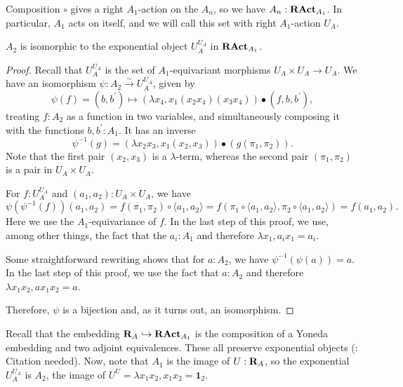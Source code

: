 \begin{definition}
  Composition $ \circ $ gives a right $ A_1 $-action on the $ A_n $, so we have $ A_n : \mathbf{RAct}_{A_1} $. In particular, $ A_1 $ acts on itself, and we will call this set with right $ A_1 $-action $ U_A $.
\end{definition}

\begin{lemma}
  $ A_2 $ is isomorphic to the exponential object $ U_A^{U_A} $ in $ \mathbf{RAct}_{A_1} $.
\end{lemma}
\begin{proof}
  Recall that $ U_A^{U_A} $ is the set of $ A_1 $-equivariant morphisms $ U_A \times U_A \to U_A $. We have an isomorphism $ \psi: A_2 \xrightarrow \sim U_A^{U_A} $, given by
  \[ \psi(f) = (b, b^\prime) \mapsto (\lambda x_4, x_1 (x_2 x_4) (x_3 x_4)) \bullet (f, b, b^\prime), \]
  treating $ f : A_2 $ as a function in two variables, and simultaneously composing it with the functions $ b, b^\prime : A_1 $. It has an inverse
  \[ \psi^{-1}(g) = (\lambda x_2 x_3, x_1 (x_2, x_3)) \bullet (g(\pi_1, \pi_2)). \]
  Note that the first pair $ (x_2, x_3) $ is a $ \lambda $-term, whereas the second pair $ (\pi_1, \pi_2) $ is a pair in $ U_A \times U_A $.

  For $ f: U_A^{U_A} $ and $ (a_1, a_2): U_A \times U_A $, we have
  \[
    \psi(\psi^{-1}(f))(a_1, a_2)
    = f(\pi_1, \pi_2) \circ \langle a_1, a_2 \rangle
    = f(\pi_1 \circ \langle a_1, a_2 \rangle, \pi_2 \circ \langle a_1, a_2 \rangle)
    = f(a_1, a_2).
  \]
  Here we use the $ A_1 $-equivariance of $ f $. In the last step of this proof, we use, among other things, the fact that the $ a_i : A_1 $ and therefore $ \lambda x_1, a_i x_1 = a_i $.

  Some straightforward rewriting shows that for $ a: A_2 $, we have $ \psi^{-1}(\psi(a)) = a $. In the last step of this proof, we use the fact that $ a : A_2 $ and therefore $ \lambda x_1 x_2, a x_1 x_2 = a $.

  Therefore, $ \psi $ is a bijection and, as it turns out, an isomorphism.
\end{proof}

\begin{remark}
  Recall that the embedding $ \mathbf{R}_A \hookrightarrow \mathbf{RAct}_{A_1} $ is the composition of a Yoneda embedding and two adjoint equivalences. These all preserve exponential objects (\TODO: Citation needed). Now, note that $ A_1 $ is the image of $ U : \mathbf{R}_A $, so the exponential $ U_A^{U_A} $ is $ A_2 $, the image of $ U^U = \lambda x_1 x_2, x_1 x_2 = \mathbf 1_2 $.
\end{remark}

